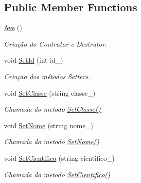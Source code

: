 \subsection*{Public Member Functions}
\begin{DoxyCompactItemize}
\item 
\mbox{\hyperlink{class_ave_a31bc97c3258df566381300c8b9abc73a}{Ave}} ()
\begin{DoxyCompactList}\small\item\em Criação do Contrutor e Destrutor. \end{DoxyCompactList}\item 
void \mbox{\hyperlink{class_ave_add888c033de541a44c5c31a31db5ad1d}{Set\+Id}} (int id\+\_\+)
\begin{DoxyCompactList}\small\item\em Criação dos métodos Setters. \end{DoxyCompactList}\item 
\mbox{\label{class_ave_ae393103817453e9165a9ff7fb6a73bd9}} 
void \mbox{\hyperlink{class_ave_ae393103817453e9165a9ff7fb6a73bd9}{Set\+Classe}} (string classe\+\_\+)
\begin{DoxyCompactList}\small\item\em Chamada do metodo \mbox{\hyperlink{class_ave_ae393103817453e9165a9ff7fb6a73bd9}{Set\+Classe()}} \end{DoxyCompactList}\item 
\mbox{\label{class_ave_a577d65a227548e30ced15c41706d38ae}} 
void \mbox{\hyperlink{class_ave_a577d65a227548e30ced15c41706d38ae}{Set\+Nome}} (string nome\+\_\+)
\begin{DoxyCompactList}\small\item\em Chamada do metodo \mbox{\hyperlink{class_ave_a577d65a227548e30ced15c41706d38ae}{Set\+Nome()}} \end{DoxyCompactList}\item 
\mbox{\label{class_ave_a4e3b9ce1813889f3c89ad68100a2e297}} 
void \mbox{\hyperlink{class_ave_a4e3b9ce1813889f3c89ad68100a2e297}{Set\+Cientifico}} (string cientifico\+\_\+)
\begin{DoxyCompactList}\small\item\em Chamada do metodo \mbox{\hyperlink{class_ave_a4e3b9ce1813889f3c89ad68100a2e297}{Set\+Cientifico()}} \end{DoxyCompactList}\item 

\end{DoxyCompactItemize}
